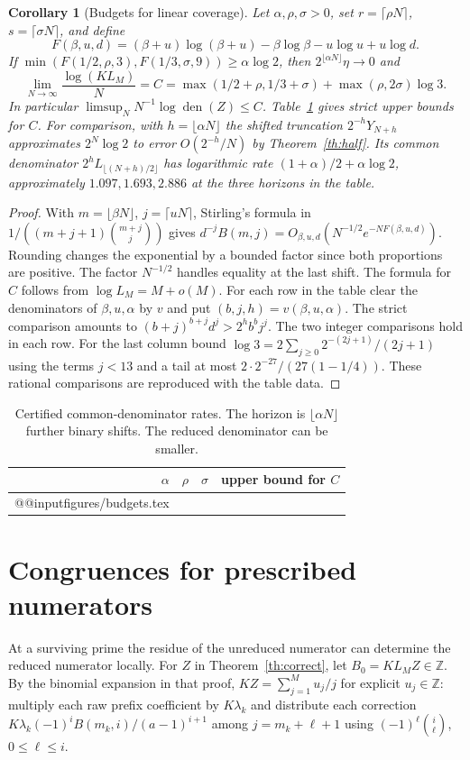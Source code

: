 \documentclass[11pt]{article}
\makeatletter
\newtheorem{corollary}[theorem]{Corollary}
\DeclareMathOperator{\den}{den}
\newcommand{\Z}{\mathbb Z}
\newcommand{\inputrows}[1]{\csname @@input\endcsname #1 }
\makeatother
\begin{document}
\begin{corollary}[Budgets for linear coverage]\label{cor:budgets}
Let $\alpha,\rho,\sigma>0$, set $r=\lceil\rho N\rceil$,
$s=\lceil\sigma N\rceil$, and define
\[
 F(\beta,u,d)=(\beta+u)\log(\beta+u)-\beta\log\beta-u\log u+u\log d.
\]
If $\min(F(1/2,\rho,3),F(1/3,\sigma,9))\ge\alpha\log2$, then
$2^{\lfloor\alpha N\rfloor}\eta\to0$ and
\[
 \lim_{N\to\infty}\frac{\log(KL_M)}N=
 C=\max(1/2+\rho,1/3+\sigma)+\max(\rho,2\sigma)\log3 .
\]
In particular $\limsup_N N^{-1}\log\den(Z)\le C$. Table~\ref{tab:budgets}
gives strict upper bounds for $C$. For comparison, with $h=\lfloor\alpha N\rfloor$ the shifted truncation $2^{-h}Y_{N+h}$ approximates $2^N\log 2$ to error $O(2^{-h}/N)$ by Theorem~\ref{th:half}. Its common denominator $2^h L_{\lfloor(N+h)/2\rfloor}$ has logarithmic rate $(1+\alpha)/2+\alpha\log 2$, approximately $1.097,1.693,2.886$ at the three horizons in the table.
\end{corollary}
\begin{proof}
With $m=\lfloor\beta N\rfloor$, $j=\lceil uN\rceil$, Stirling's formula
in $1/((m+j+1)\binom{m+j}{j})$ gives
$d^{-j} B(m,j)=O_{\beta,u,d}(N^{-1/2}e^{-NF(\beta,u,d)})$.
Rounding changes the exponential by a bounded factor since both proportions
are positive. The factor $N^{-1/2}$ handles equality at the last shift.
The formula for $C$ follows from $\log L_M=M+o(M)$.
For each row in the table clear the denominators of $\beta,u,\alpha$ by $v$
and put $(b,j,h)=v(\beta,u,\alpha)$. The strict comparison amounts to
$(b+j)^{b+j}d^j>2^h b^b j^j$. The two integer comparisons hold in each row.
For the last column bound $\log3=2\sum_{j\ge0}2^{-(2j+1)}/(2j+1)$
using the terms $j<13$ and a tail at most
$2\cdot 2^{-27}/(27(1-1/4))$. These rational comparisons are reproduced
with the table data.
\end{proof}

\begin{table}[ht]
\centering
\caption{Certified common-denominator rates. The horizon is $\lfloor\alpha N\rfloor$
further binary shifts. The reduced denominator can be smaller.}\label{tab:budgets}\smallskip
\begin{tabular}{rrrr}\toprule
$\alpha$ & $\rho$ & $\sigma$ & upper bound for $C$\\\midrule
\inputrows{figures/budgets.tex}
\bottomrule\end{tabular}
\end{table}

\section{Congruences for prescribed numerators}\label{sec:num}
At a surviving prime the residue of the unreduced numerator can determine the reduced numerator locally. For $Z$ in
Theorem~\ref{th:correct}, let $B_0=KL_M Z\in\Z$. By the binomial expansion
in that proof, $KZ=\sum_{j=1}^M u_j/j$ for explicit $u_j\in\Z$:
multiply each raw prefix coefficient by $K\lambda_k$ and distribute each
correction $K\lambda_k(-1)^i B(m_k,i)/(a-1)^{i+1}$ among
$j=m_k+\ell+1$ using $(-1)^\ell\binom i\ell$, $0\le\ell\le i$.
\end{document}
